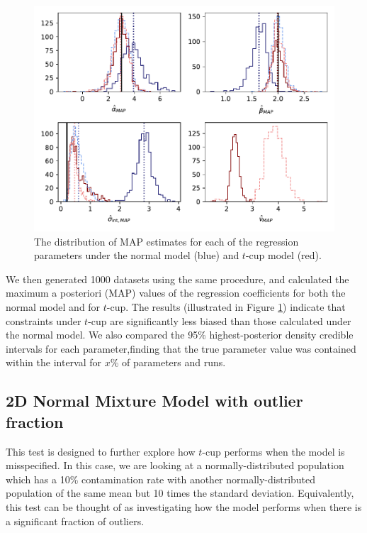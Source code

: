 \documentclass[fleqn,usenatbib]{mnras}
\begin{document}
\begin{figure}
    \includegraphics[width=\columnwidth]{graphics/outlier_many.pdf}
    \caption{The distribution of MAP estimates for each
    of the regression parameters under the normal model (blue) and $t$-cup model
    (red).}
    \label{fig:results.outlier.map}
\end{figure}

We then generated 1000 datasets using the same procedure, and calculated the
maximum a posteriori (MAP) values of the regression coefficients for both the
normal model and for $t$-cup. The results (illustrated in Figure
\ref{fig:results.outlier.map}) indicate that {\color{red} constraints under
$t$-cup are significantly less biased than those calculated under the normal
model. We also compared the 95\% highest-posterior density credible intervals
for each parameter,finding that the true parameter value was contained within
the interval for $x$\% of parameters and runs. }


\subsection{2D Normal Mixture Model with outlier fraction}
\label{sec:results.gmm}

This test is designed to further explore how $t$-cup performs when the model is
misspecified. In this case, we are looking at a normally-distributed population
which has a 10\% contamination rate with another normally-distributed population
of the same mean but 10 times the standard deviation. Equivalently, this test
can be thought of as investigating how the model performs when there is a
significant fraction of outliers.
\end{document}
